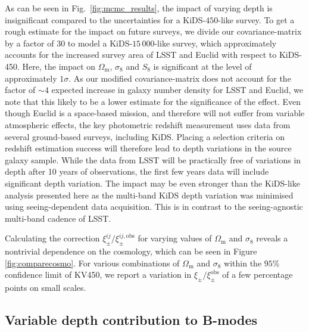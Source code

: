 \documentclass{aa}
\renewcommand{\rm}{\mathrm}
\begin{document}
As can be seen in Fig.~\ref{fig:mcmc_results}, the impact of varying depth is insignificant compared to the uncertainties for a KiDS-$450$-like survey. To get a rough estimate for the impact on future surveys, we divide our covariance-matrix by a factor of 30 to model a KiDS-$15\,000$-like survey, which approximately accounts for the increased survey area of LSST and Euclid with respect to KiDS-450. Here, the impact on $\Omega_{\rm m}$, $\sigma_8$ and $S_8$ is significant at the level of approximately $1\sigma$. As our modified covariance-matrix does not account for the factor of $\sim \! 4$ expected increase in galaxy number density for LSST and Euclid, we note that this likely to be a lower estimate for the significance of the effect.
 Even though Euclid is a space-based mission, and therefore will not suffer from variable atmospheric effects, the key photometric redshift measurement uses data from several ground-based surveys, including KiDS.   Placing a selection criteria on redshift estimation success will therefore lead to depth variations in the source galaxy sample. While the data from LSST will be practically free of variations in depth after 10 years of observations, the first few years data will include significant depth variation. The impact may be even stronger than the KiDS-like analysis presented here as the multi-band KiDS depth variation was minimised using seeing-dependent data acquisition. This is in contrast to the seeing-agnostic multi-band cadence of LSST.


Calculating the correction $\xi_\pm^{ij}/\xi_\pm^{ij,\rm{obs}}$ for varying values of $\Omega_{\rm{m}}$ and $\sigma_8$ reveals a nontrivial dependence on the cosmology, which can be seen in Figure \ref{fig:comparecosmo}. For various combinations of $\Omega_{\rm{m}}$ and $\sigma_8$ within the $95\%$ confidence limit of KV450, we report a variation in $\xi_\pm/\xi_\pm^{\rm{obs}}$ of a few percentage points on small scales.

\subsection{Variable depth contribution to B-modes}
\end{document}
